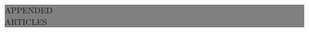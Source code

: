 \begin{titlepage} %
 
	
	\colorbox{grey}{
		\parbox[t]{0.93\textwidth}{ %
			\parbox[t]{0.91\textwidth}{ %
				\raggedleft %
				\fontsize{50pt}{80pt}\selectfont %
				\vspace{0.7cm} %
				
				APPENDED\\
				ARTICLES\\
			
				\vspace{0.7cm} %
			}
		}
	}
	
	\vfill %
	
	
%		
	


 


\end{titlepage}
